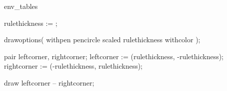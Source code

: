 \startenvironment env_tables

\usemodule[database]

\defineseparatedlist
[CSV] %
[separator={,},
quotechar={"},
before=,after=, %
first=\bTR,last=\eTR,
left=\bTD,right=\eTD]

  rulethickness := ;

  drawoptions(
    withpen pencircle scaled rulethickness
    withcolor );

  pair leftcorner, rightcorner;
  leftcorner  := (rulethickness, \overlayheight-rulethickness);
  rightcorner := (\overlaywidth-rulethickness, rulethickness);

  draw leftcorner -- rightcorner;
\stopuseMPgraphic


  \DiagonalLabel{%
  \setuptabulate [after={\blank[\frameddimension{offset}]}]
  \starttabulate [|p|r|]
    \NC    \NC #2 \NC\NR
    \NC #1 \NC    \NC\NR
  \stoptabulate
}

\stopenvironment
